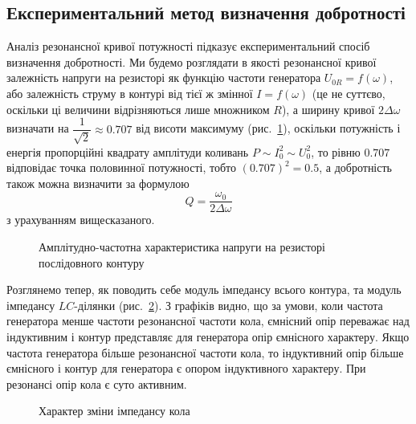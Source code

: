 \subsection{Експериментальний метод визначення добротності}

Аналіз резонансної кривої потужності підказує експериментальний спосіб визначення добротності. Ми будемо розглядати в якості резонансної кривої залежність напруги на резисторі як функцію частоти генератора $U_{0R} = f(\omega)$, або  залежність струму в контурі від тієї ж змінної $I = f(\omega)$ (це не суттєво, оскільки ці величини відрізняються лише множником $R$), а ширину кривої $2\Delta\omega$ визначати на $\dfrac1{\sqrt2}\approx 0.707$ від висоти максимуму (рис.~\ref{plt:I(o)}),  оскільки потужність і енергія пропорційні квадрату амплітуди коливань $P \sim I_0^2 \sim U_0^2 $, то рівню $0.707$ відповідає точка половинної потужності, тобто $(0.707)^2 = 0.5$, а добротність також можна визначити за формулою 
\begin{equation*}
Q = \frac{\omega_0}{2\Delta\omega}
\end{equation*}
з урахуванням вищесказаного.

\begin{figure}[!h]\centering
	\begin{minipage}{0.75\linewidth}
		
		\caption{Амплітудно-частотна характеристика напруги на резисторі послідовного контуру}
		\label{plt:I(o)}
	\end{minipage}
\end{figure}

Розглянемо тепер, як поводить себе модуль імпедансу всього контура, та модуль імпедансу $LC$-ділянки (рис.~\ref{plt:impedance_character}). З графіків видно, що за умови, коли частота генератора менше частоти резонансної частоти кола, ємнісний опір переважає над індуктивним і контур представляє для генератора опір ємнісного характеру. Якщо частота генератора більше резонансної частоти кола, то індуктивний опір більше ємнісного і контур для генератора є опором індуктивного характеру. При резонансі опір кола є суто активним.

\begin{figure}[!h]\centering
	
	\caption{Характер зміни імпедансу кола}
	\label{plt:impedance_character}
\end{figure}

